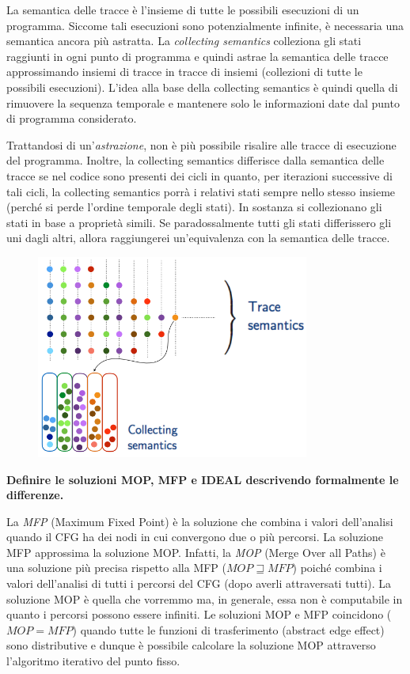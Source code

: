 \documentclass[a4paper,oneside,titlepage]{book}
\begin{document}
La semantica delle tracce è l'insieme di tutte le possibili esecuzioni di un programma. Siccome tali esecuzioni sono potenzialmente infinite, è necessaria una semantica ancora più astratta. La \textit{collecting semantics} colleziona gli stati raggiunti in ogni punto di programma e quindi astrae la semantica delle tracce approssimando insiemi di tracce in tracce di insiemi (collezioni di tutte le possibili esecuzioni). L'idea alla base della collecting semantics è quindi quella di rimuovere la sequenza temporale e mantenere solo le informazioni date dal punto di programma considerato.

Trattandosi di un'\textit{astrazione}, non è più possibile risalire alle tracce di esecuzione del programma. Inoltre, la collecting semantics differisce dalla semantica delle tracce se nel codice sono presenti dei cicli in quanto, per iterazioni successive di tali cicli, la collecting semantics porrà i relativi stati sempre nello stesso insieme (perché si perde l'ordine temporale degli stati). In sostanza si collezionano gli stati in base a proprietà simili. Se paradossalmente tutti gli stati differissero gli uni dagli altri, allora raggiungerei un'equivalenza con la semantica delle tracce.
\begin{figure}[htp]
	\centering
	\includegraphics[width=0.8\textwidth]{cs2.png}
\end{figure}
\newline
\noindent
\textbf{Definire le soluzioni MOP, MFP e IDEAL descrivendo formalmente le differenze.}

La \textit{MFP} (Maximum Fixed Point) è la soluzione che combina i valori dell'analisi quando il CFG ha dei nodi in cui convergono due o più percorsi. La soluzione MFP approssima la soluzione MOP. Infatti, la \textit{MOP} (Merge Over all Paths) è una soluzione più precisa rispetto alla MFP ($MOP \sqsupseteq MFP$) poiché combina i valori dell'analisi di tutti i percorsi del CFG (dopo averli attraversati tutti). La soluzione MOP è quella che vorremmo ma, in generale, essa non è computabile in quanto i percorsi possono essere infiniti. Le soluzioni MOP e MFP coincidono ($MOP = MFP$) quando tutte le funzioni di trasferimento (abstract edge effect) sono distributive e dunque è possibile calcolare la soluzione MOP attraverso l'algoritmo iterativo del punto fisso.
\end{document}

